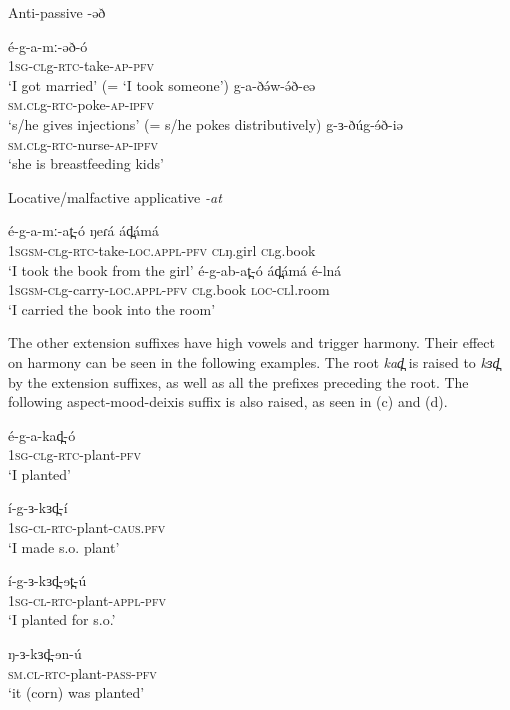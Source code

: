 \ea Anti-passive -əð
\begin{xlist}
	\ex \gll é-g-a-mː-əð-ó	\\
		1\textsc{sg}-\textsc{cl}g-\textsc{rtc}-take-\textsc{ap}-\textsc{pfv}  \\			
	\trans ‘I got married’ (= ‘I took someone’) 
	\ex \gll g-a-ðə́w-ə́ð-eə 		\\
		\textsc{sm.cl}g-\textsc{rtc}-poke-\textsc{ap}-\textsc{ipfv}  	\\
	\trans ‘s/he gives injections’ (= s/he pokes distributively)
	\ex \gll g-ɜ-ðúg-ɘ́ð-iə	\\
		\textsc{sm.cl}g-\textsc{rtc}-nurse-\textsc{ap}-\textsc{ipfv}  \\
	\trans ‘she is breastfeeding kids’
\end{xlist}
\z

\ea Locative/malfactive applicative \textit{-at}
\begin{xlist}
	\ex \gll é-g-a-mː-at̪-ó 	ŋeɾá 	ád̪ámá 	\\
		1\textsc{sgsm-cl}g-\textsc{rtc}-take-\textsc{loc.appl}-\textsc{pfv}	\textsc{cl}ŋ.girl	\textsc{cl}g.book  \\
	 \trans ‘I took the book from the girl’
	\ex \gll é-g-ab-at̪-ó 	ád̪ámá 	é-lná \\
		1\textsc{sgsm-cl}g-carry-\textsc{loc.appl}-\textsc{pfv}	\textsc{cl}g.book  	\textsc{loc-cl}l.room\\
	\trans ‘I carried the book into the room’
\end{xlist}
\z

The other extension suffixes have high vowels and trigger harmony. Their effect on harmony can be seen in the following examples. The root \textit{kad̪} is raised to \textit{kɜd̪} by the extension suffixes, as well as all the prefixes preceding the root. The following aspect-mood-deixis suffix is also raised, as seen in (c) and (d). 

\ea
\begin{xlist}
\ex \gll	é-g-a-kad̪-ó\\  			
 	1\textsc{sg-cl}g-\textsc{rtc}-plant-\textsc{pfv}\\  			
 	\trans ‘I planted’ 					

\ex \gll 	í-g-ɜ-kɜd̪-í\\
	1\textsc{sg-cl}-\textsc{rtc}-plant-\textsc{caus}.\textsc{pfv}\\
	\trans ‘I made s.o. plant’

\ex \gll	í-g-ɜ-kɜd̪-ɘt̪-ú \\ 				
 	1\textsc{sg-cl}-\textsc{rtc}-plant-\textsc{appl}-\textsc{pfv} \\
 	\trans ‘I planted for s.o.’ 

\ex \gll 	ŋ-ɜ-kɜd̪-ɘn-ú\\
	\textsc{sm.cl}-\textsc{rtc}-plant-\textsc{pass}-\textsc{pfv}\\
	\trans ‘it (corn) was planted’
\end{xlist}
\z


